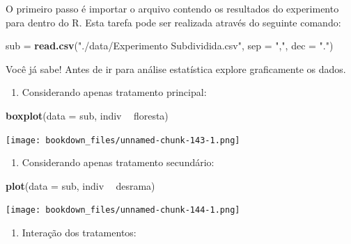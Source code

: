 \documentclass[
]{article}
\newenvironment{Shaded}{\begin{snugshade}}{\end{snugshade}}
\newcommand{\DataTypeTok}[1]{\textcolor[rgb]{0.13,0.29,0.53}{#1}}
\newcommand{\KeywordTok}[1]{\textcolor[rgb]{0.13,0.29,0.53}{\textbf{#1}}}
\newcommand{\NormalTok}[1]{#1}
\newcommand{\OperatorTok}[1]{\textcolor[rgb]{0.81,0.36,0.00}{\textbf{#1}}}
\newcommand{\StringTok}[1]{\textcolor[rgb]{0.31,0.60,0.02}{#1}}
\providecommand{\tightlist}{%
  \setlength{\itemsep}{0pt}\setlength{\parskip}{0pt}}
\begin{document}
O primeiro passo é importar o arquivo contendo os resultados do experimento para dentro do R. Esta tarefa pode ser realizada através do seguinte comando:

\begin{Shaded}
\begin{Highlighting}[]
\NormalTok{sub =}\StringTok{ }\KeywordTok{read.csv}\NormalTok{(}\StringTok{"./data/Experimento Subdividida.csv"}\NormalTok{, }
               \DataTypeTok{sep =} \StringTok{","}\NormalTok{, }\DataTypeTok{dec =} \StringTok{"."}\NormalTok{)}
\end{Highlighting}
\end{Shaded}

Você já sabe! Antes de ir para análise estatística explore graficamente os dados.

\begin{enumerate}
\def\labelenumi{\arabic{enumi}.}
\tightlist
\item
  Considerando apenas tratamento principal:
\end{enumerate}

\begin{Shaded}
\begin{Highlighting}[]
\KeywordTok{boxplot}\NormalTok{(}\DataTypeTok{data =}\NormalTok{ sub, indiv }\OperatorTok{~}\StringTok{ }\NormalTok{floresta)}
\end{Highlighting}
\end{Shaded}

\texttt{[image: bookdown\_files/unnamed-chunk-143-1.png]}

\begin{enumerate}
\def\labelenumi{\arabic{enumi}.}
\setcounter{enumi}{1}
\tightlist
\item
  Considerando apenas tratamento secundário:
\end{enumerate}

\begin{Shaded}
\begin{Highlighting}[]
\KeywordTok{plot}\NormalTok{(}\DataTypeTok{data =}\NormalTok{ sub, indiv }\OperatorTok{~}\StringTok{ }\NormalTok{desrama)}
\end{Highlighting}
\end{Shaded}

\texttt{[image: bookdown\_files/unnamed-chunk-144-1.png]}

\begin{enumerate}
\def\labelenumi{\arabic{enumi}.}
\setcounter{enumi}{2}
\tightlist
\item
  Interação dos tratamentos:
\end{enumerate}
\end{document}
